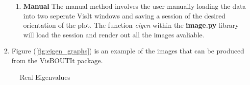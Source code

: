 \documentclass[12pt,a4paper]{article}
\begin{document}
\begin{enumerate}
\begin{enumerate}
		\item{\textbf{Manual} The manual method involves the user manually loading the data into two seperate VisIt windows and saving a session of the desired orientation of the plot. The function \textit{eigen} within the \textbf{image.py} library will load the session and render out all the images avaliable.}
	
	\end{enumerate}
	\item{Figure (\ref{fig:eigen_graphs}) is an example of the images that can be produced from the VisBOUTIt package.}
\end{enumerate}


\begin{figure}[H]
	\centering
	\begin{minipage}[H]{0.75\textwidth}
		\caption{Real Eigenvalues}
		\label{fig:eigen_real}
	\end{minipage}%
	\hfill
	\begin{minipage}[H]{0.75\textwidth}

\end{minipage}
\end{figure}
\end{document}
